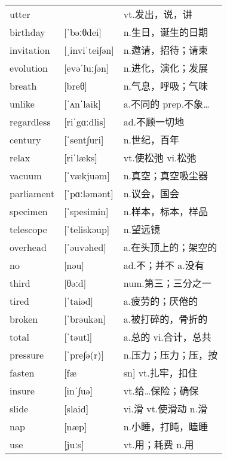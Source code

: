 \documentclass[a4paper]{article}
\begin{document}
\section{}
\begin{tabular}{l l l}

utter &  & vt.发出，说，讲 \\
birthday & [ˈbəːθdei] & n.生日，诞生的日期 \\
invitation & [ˌinviˈtei∫ən] & n.邀请，招待；请柬 \\
evolution & [evəˈluː∫ən] & n.进化，演化；发展 \\
breath & [breθ] & n.气息，呼吸；气味 \\
unlike & [ˈʌnˈlaik] & a.不同的 prep.不象… \\
regardless & [riˈgɑːdlis] & ad.不顾一切地 \\
century & [ˈsent∫uri] & n.世纪，百年 \\
relax & [riˈlæks] & vt.使松弛 vi.松弛 \\
vacuum & [ˈvækjuəm] & n.真空；真空吸尘器 \\
parliament & [ˈpɑːləmənt] & n.议会，国会 \\
specimen & [ˈspesimin] & n.样本，标本，样品 \\
telescope & [ˈteliskəup] & n.望远镜 \\
overhead & [ˈəuvəhed] & a.在头顶上的；架空的 \\
no & [nəu] & ad.不；并不 a.没有 \\
third & [θəːd] & num.第三；三分之一 \\
tired & [ˈtaiəd] & a.疲劳的；厌倦的 \\
broken & [ˈbrəukən] & a.被打碎的，骨折的 \\
total & [ˈtəutl] & a.总的 vi.合计，总共 \\
pressure & [ˈpre∫ə(r)] & n.压力；压力；压，按 \\
fasten & [fæ & sn] vt.扎牢，扣住 \\
insure & [inˈ∫uə] & vt.给…保险；确保 \\
slide & [slaid] & vi.滑 vt.使滑动 n.滑 \\
nap & [næp] & n.小睡，打盹，瞌睡 \\
use & [juːs] & vt.用；耗费 n.用 \\

\end{tabular}
\end{document}
